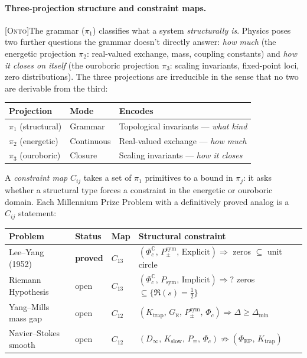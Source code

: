 \documentclass[12pt,a4paper]{article}
\newcommand{\Phic}{\Phi_c}
\newcommand{\Ppms}{P_{\pm}^{\text{sym}}}
\newcommand{\ONTO}{\textsc{[Onto]}}
\begin{document}
\paragraph{Three-projection structure and constraint maps.}
\ONTO\quad The grammar ($\pi_1$) classifies what a system
\emph{structurally is}. Physics poses two further questions the
grammar doesn't directly answer: \emph{how much} (the energetic
projection $\pi_2$: real-valued exchange, mass, coupling constants)
and \emph{how it closes on itself} (the ouroboric projection $\pi_3$:
scaling invariants, fixed-point loci, zero distributions).
The three projections are irreducible in the sense that no two are
derivable from the third:

\begin{center}
\small
\begin{tabular}{llp{5.5cm}}
\toprule
Projection & Mode & Encodes \\
\midrule
$\pi_1$ (structural) & Grammar & Topological invariants --- \emph{what kind} \\
$\pi_2$ (energetic) & Continuous & Real-valued exchange --- \emph{how much} \\
$\pi_3$ (ouroboric) & Closure & Scaling invariants --- \emph{how it closes} \\
\bottomrule
\end{tabular}
\end{center}

A \emph{constraint map} $C_{ij}$ takes a set of $\pi_1$ primitives
to a bound in $\pi_j$: it asks whether a structural type forces a
constraint in the energetic or ouroboric domain.
Each Millennium Prize Problem with a definitively proved analog
is a $C_{ij}$ statement:

\begin{center}
\small
\begin{tabular}{llll}
\toprule
Problem & Status & Map & Structural constraint \\
\midrule
Lee--Yang (1952) & \textbf{proved} & $C_{13}$ & $(\Phi_c^{\mathbb{C}},\, \Ppms,\, \text{Explicit}) \Rightarrow$ zeros $\subseteq$ unit circle \\
Riemann Hypothesis & open & $C_{13}$ & $(\Phi_c^{\mathbb{C}},\, P_\text{sym},\, \text{Implicit}) \Rightarrow?$ zeros $\subseteq \{\Re(s) = \tfrac{1}{2}\}$ \\
Yang--Mills mass gap & open & $C_{12}$ & $(K_\text{trap},\, G_\aleph,\, \Ppms,\, \Phic) \Rightarrow \Delta \geq \Delta_\text{min}$ \\
Navier--Stokes smooth & open & $C_{12}$ & $(D_\infty,\, K_\text{slow},\, P_\equiv,\, \Phic) \not\Rightarrow (\Phi_\text{EP},\, K_\text{trap})$ \\
\bottomrule
\end{tabular}
\end{center}
\end{document}
